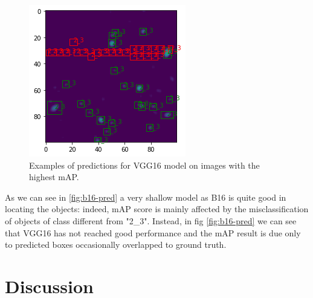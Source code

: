 \documentclass[a4paper,10pt]{report}
\begin{document}
\begin{figure}[!htb]
  \endminipage\hfill
  \includegraphics[width=\linewidth]{vgg16_735_17476_17879_100.png}
  \endminipage\hfill
  \caption{Examples of predictions for VGG16 model on images with the highest mAP.}
  \label{fig:vgg16-pred}
\end{figure}



As we can see in \ref{fig:b16-pred} a very shallow model as B16 is quite good in locating the objects: indeed, mAP score is mainly affected by the misclassification of objects of class different from "2\_3".
Instead, in fig \ref{fig:b16-pred} we can see that VGG16 has not reached good performance and the mAP result is due only to predicted boxes occasionally overlapped to ground truth.

{\chapter{Discussion}\label{chap:discussion}}
\end{document}
